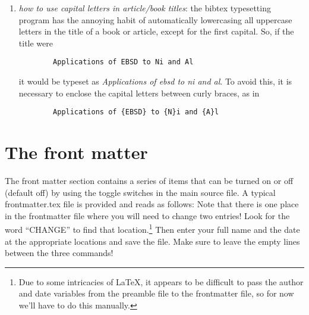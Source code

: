 \documentclass[DIV=calc, paper=letter, fontsize=11pt]{scrartcl}	 %
\begin{document}
\begin{enumerate}
	\item \textit{how to use capital letters in article/book titles}: the bibtex typesetting program has the annoying habit 
	of automatically lowercasing all uppercase letters in the title of a book or article, except for the first capital.  So, if 
	the title were 
	\begin{verbatim}
		Applications of EBSD to Ni and Al
	\end{verbatim}
	it would be typeset as \textit{Applications of ebsd to ni and al}.  To avoid this, it is necessary to enclose the capital 
	letters between curly braces, as in 
	\begin{verbatim}
		Applications of {EBSD} to {N}i and {A}l
	\end{verbatim}
\end{enumerate}

\section{The front matter\label{sec:frontmatter}}
The front matter section contains a series of items that can be turned on or off (default off) by using the toggle switches in
the main source file.  A typical \textsf{frontmatter.tex} file is provided and reads as follows:
Note that there is one place in the frontmatter file where you will need to change two entries!  Look for the word ``CHANGE''
to find that location.\footnote{Due to some intricacies of \LaTeX, it appears to be difficult to pass the author and date variables from 
the preamble file to the frontmatter file, so for now we'll have to do this manually.}  Then enter your full name and the date at
the appropriate locations and save the file.  Make sure to leave the empty lines between the three commands!
\end{document}
